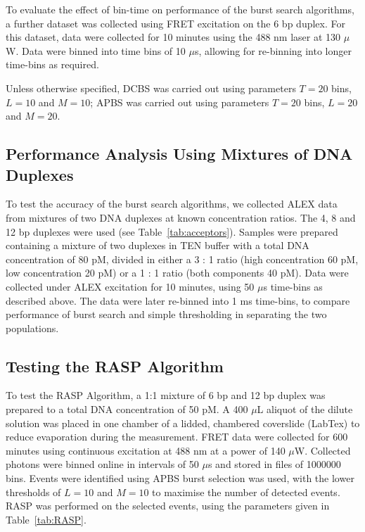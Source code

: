 To evaluate the effect of bin-time on performance of the burst search algorithms, a further dataset was collected using FRET excitation on the 6 bp duplex. For this dataset, data were collected for 10 minutes using the 488 nm laser at 130 $\mu$W. Data were binned into time bins of 10 $\mu$s, allowing for re-binning into longer time-bins as required.

Unless otherwise specified, DCBS was carried out using parameters $T = 20$ bins, $L = 10$ and $M = 10$; APBS was carried out using parameters $T = 20$ bins, $L = 20$ and $M = 20$.

\subsection{Performance Analysis Using Mixtures of DNA Duplexes}
To test the accuracy of the burst search algorithms, we collected ALEX data from mixtures of two DNA duplexes at known concentration ratios. The 4, 8 and 12 bp duplexes were used (see Table~\ref{tab:acceptors}). Samples were prepared containing a mixture of two duplexes in TEN buffer with a total DNA concentration of 80 pM, divided in either a 3 : 1 ratio (high concentration 60 pM, low concentration 20 pM) or a 1 : 1 ratio (both components 40 pM). Data were collected under ALEX excitation for 10 minutes, using 50 $\mu$s time-bins as described above. The data were later re-binned into 1 ms time-bins, to compare performance of burst search and simple thresholding in separating the two populations.  


\subsection{Testing the RASP Algorithm}
To test the RASP Algorithm, a 1:1 mixture of 6 bp and 12 bp duplex was prepared to a total DNA concentration of 50 pM. A 400 $\mu$L aliquot of the dilute solution was placed in one chamber of a lidded, chambered coverslide (LabTex) to reduce evaporation during the measurement. FRET data were collected for 600 minutes using continuous excitation at 488 nm at a power of 140 $\mu$W. Collected photons were binned online in intervals of 50 $\mu$s and stored in files of 1000000 bins. Events were identified using APBS burst selection was used, with the lower thresholds of $L = 10$ and $M = 10$ to maximise the number of detected events. RASP was performed on the selected events, using the parameters given in Table~\ref{tab:RASP}. 

